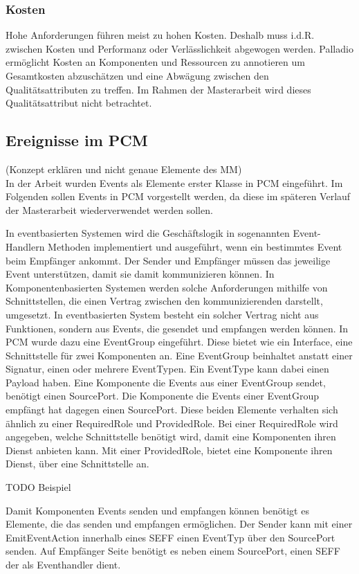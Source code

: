 \subsubsection{Kosten}
Hohe Anforderungen führen meist zu hohen Kosten. Deshalb muss i.d.R. zwischen Kosten und Performanz oder Verlässlichkeit abgewogen werden. Palladio ermöglicht Kosten an Komponenten und Ressourcen zu annotieren um Gesamtkosten abzuschätzen und eine Abwägung zwischen den Qualitätsattributen zu treffen. Im Rahmen der Masterarbeit wird dieses Qualitätsattribut nicht betrachtet.

\subsection{Ereignisse im PCM}
(Konzept erklären und nicht genaue Elemente des MM) \\
In der Arbeit \cite{Rathfelder2013} wurden Events als Elemente erster Klasse in PCM eingeführt. Im Folgenden sollen Events in PCM vorgestellt werden, da diese im späteren Verlauf der Masterarbeit wiederverwendet werden sollen. \par
In eventbasierten Systemen wird die Geschäftslogik in sogenannten Event-Handlern  Methoden implementiert und ausgeführt, wenn ein bestimmtes Event beim Empfänger ankommt. Der Sender und Empfänger müssen das jeweilige Event unterstützen, damit sie damit kommunizieren können. In Komponentenbasierten Systemen werden solche Anforderungen mithilfe von Schnittstellen, die einen Vertrag zwischen den kommunizierenden darstellt, umgesetzt. In eventbasierten System besteht ein solcher Vertrag nicht aus Funktionen, sondern aus Events, die gesendet und empfangen werden können. In PCM wurde dazu eine EventGroup eingeführt. Diese bietet wie ein Interface, eine Schnittstelle für zwei Komponenten an. Eine EventGroup beinhaltet anstatt einer Signatur, einen oder mehrere EventTypen. Ein EventType kann dabei einen Payload haben. Eine Komponente die Events aus einer EventGroup sendet, benötigt einen SourcePort. Die Komponente die Events einer EventGroup empfängt hat dagegen einen SourcePort. Diese beiden Elemente verhalten sich ähnlich zu einer RequiredRole und ProvidedRole. Bei einer RequiredRole wird angegeben, welche Schnittstelle benötigt wird, damit eine Komponenten ihren Dienst anbieten kann. Mit einer ProvidedRole, bietet eine Komponente ihren Dienst, über eine Schnittstelle an. 

TODO Beispiel

Damit Komponenten Events senden und empfangen können benötigt es Elemente, die das senden und empfangen ermöglichen. Der Sender kann mit einer EmitEventAction innerhalb eines SEFF einen EventTyp über den SourcePort senden. Auf Empfänger Seite benötigt es neben einem SourcePort, einen SEFF der als Eventhandler dient.

